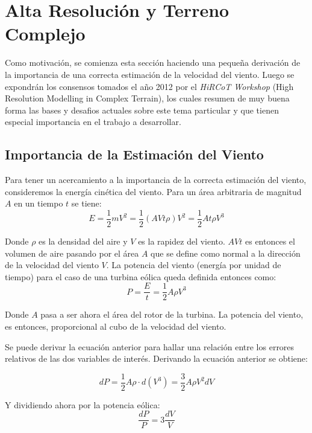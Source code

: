 \section{Alta Resolución y Terreno Complejo}
Como motivación, se comienza esta sección haciendo una pequeña derivación de la importancia de una correcta estimación de la velocidad del viento. Luego se expondrán los consensos tomados el año 2012 por el \emph{HiRCoT Workshop} (High Resolution Modelling in Complex Terrain), los cuales resumen de muy buena forma las bases y desafios actuales sobre este tema particular y que tienen especial importancia en el trabajo a desarrollar.
\subsection{Importancia de la Estimación del Viento}
Para tener un acercamiento a la importancia de la correcta estimación del viento, consideremos la energía cinética del viento. Para un área arbitraria de magnitud $A$ en un tiempo $t$ se tiene:
\begin{equation} 
E = \frac{1}{2}mV^2 = \frac{1}{2}(AVt\rho)V^2 = \frac{1}{2}At\rho V^3
\end{equation}

Donde $\rho$ es la densidad del aire y $V$ es la rapidez del viento. $AVt$ es entonces el volumen de aire pasando por el área $A$ que se define como normal a la dirección de la velocidad del viento $V$. La potencia del viento (energía por unidad de tiempo) para el caso de una turbina eólica queda definida entonces como:
\begin{equation}
P = \frac{E}{t} = \frac{1}{2}A\rho V^3
\end{equation}

Donde $A$ pasa a ser ahora el área del rotor de la turbina. La potencia del viento, es entonces, proporcional al cubo de la velocidad del viento.

Se puede derivar la ecuación anterior para hallar una relación entre los errores relativos de las dos variables de interés. Derivando la ecuación anterior se obtiene:

\begin{equation}
dP = \frac{1}{2}A\rho\cdot d(V^3) = \frac{3}{2}A\rho V^2 dV
\end{equation}

Y dividiendo ahora por la potencia eólica:
\begin{equation}
\frac{dP}{P} = 3\frac{dV}{V}
\end{equation}

